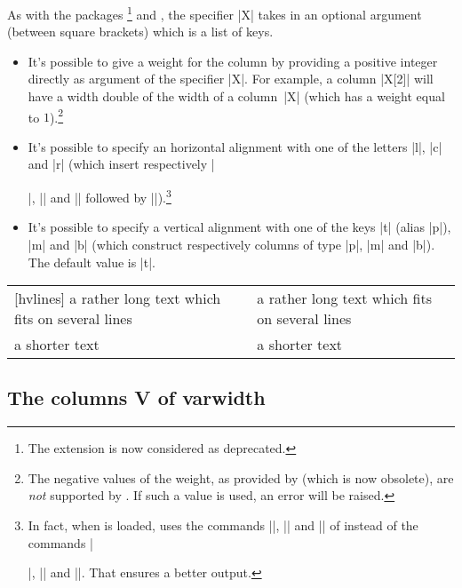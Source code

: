 \documentclass[dvipsnames]{article}%
\begin{document}
As with the packages \footnote{The extension  is now
considered as deprecated.} and , the specifier |X| takes
in an optional argument (between square brackets) which is a list of keys.
\begin{itemize}
\item It's possible to give a weight for the column by providing a positive
integer directly as argument of the specifier |X|. For example, a column
|X[2]| will have a width double of the width of a column~|X| (which has a
weight equal to $1$).\footnote{The negative values of the weight, as provided
by  (which is now obsolete), are \emph{not} supported by .
If such a value is used, an error will be raised.}
\item It's possible to specify an horizontal alignment with one of the
letters |l|, |c| and |r| (which insert respectively |\raggedright|,
|\centering| and |\raggedleft| followed by |\arraybackslash|).\footnote{In fact,
when  is loaded,  uses the commands
|\RaggedRight|, |\Centering| and |\RaggedLeft| of  instead of the
commands |\raggedright|, |\centering| and |\raggedleft|. That ensures a better output.}
\item It's possible to specify a vertical alignment with one of the keys
|t| (alias |p|), |m| and |b| (which construct respectively columns of type
|p|, |m| and |b|). The default value is |t|.
\end{itemize}


\begin{center}
\begin{NiceTabular}[width=9cm]{X[2,l]X[l]}[hvlines]
a rather long text which fits on several lines 
& a rather long text which fits on several lines \\
a shorter text & a shorter text
\end{NiceTabular}
\end{center}


\subsection{The columns V of varwidth}
\end{document}
